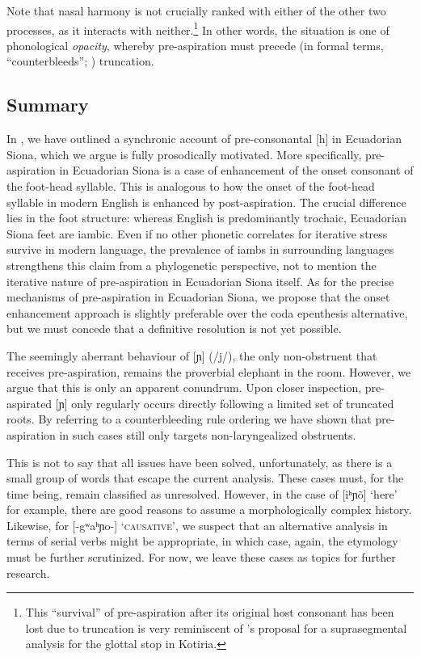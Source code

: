 \documentclass[output=paper]{langscibook}
\begin{document}
Note that nasal harmony is not crucially ranked with either of the other two processes, as it interacts with neither.\footnote{This ``survival'' of pre-aspiration after its original host consonant has been lost due to truncation is very reminiscent of \citet{Stenzel:2007}'s proposal for a suprasegmental analysis for the glottal stop in Kotiria.} In other words, the situation is one of phonological \emph{opacity}, whereby pre-aspiration must precede (in formal terms, ``counterbleeds''; \citealt{Kiparsky:1973}) truncation.


 



\subsection{Summary}
In , we have outlined a synchronic account of pre-consonantal [h] in Ecuadorian Siona, which we argue is fully prosodically motivated. More specifically, pre-aspiration in Ecuadorian Siona is a case of enhancement of the onset consonant of the foot-head syllable. This is analogous to how the onset of the foot-head syllable in modern English is enhanced by post-aspiration. The crucial difference lies in the foot structure: whereas English is predominantly trochaic, Ecuadorian Siona feet are iambic. Even if no other phonetic correlates for iterative stress survive in modern language, the prevalence of iambs in surrounding languages \citep{Wheeler:1987a, JohnsonLevinsohn:1990} strengthens this claim from a phylogenetic perspective, not to mention the iterative nature of pre-aspiration in Ecuadorian Siona itself. As for the precise mechanisms of pre-aspiration in Ecuadorian Siona, we propose that the onset enhancement approach is slightly preferable over the coda epenthesis alternative, but we must concede that a definitive resolution is not yet possible.

The seemingly aberrant behaviour of [ɲ] (/j/), the only non-obstruent that receives pre-aspiration, remains the proverbial elephant in the room. However, we argue that this is only an apparent conundrum. Upon closer inspection, pre-aspirated [ɲ] only regularly occurs directly following a limited set of truncated roots. By referring to a counterbleeding rule ordering we have shown that pre-aspiration in such cases still only targets non-laryngealized obstruents.

This is not to say that all issues have been solved, unfortunately, as there is a small group of words that escape the current analysis. These cases must, for the time being, remain classified as unresolved. However, in the case of [iʰɲõ] `here' for example, there are good reasons to assume a morphologically complex history. Likewise, for [-gʷaʰɲo-] `\textsc{causative}', we suspect that an alternative analysis in terms of serial verbs might be appropriate, in which case, again, the etymology must be further scrutinized. For now, we leave these cases as topics for further research.
\end{document}
